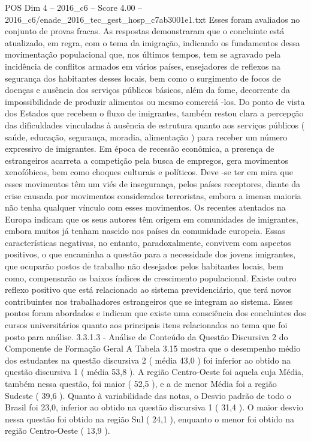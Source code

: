 \begin{textsample}{POS Dim 4 – 2016\_c6 – Score 4.00 – 2016\_c6/enade\_2016\_tec\_gest\_hosp\_c7ab3001e1.txt}
Esses foram avaliados no conjunto de provas fracas.
As respostas demonstraram que o concluinte está atualizado, em regra, com o tema da imigração, indicando os fundamentos dessa movimentação populacional que, nos últimos tempos, tem se agravado pela incidência de conflitos armados em vários países, ensejadores de reflexos na segurança dos habitantes desses locais, bem como o surgimento de focos de doenças e ausência dos serviços públicos básicos, além da fome, decorrente da impossibilidade de produzir alimentos ou mesmo comerciá -los.
Do ponto de vista dos Estados que recebem o fluxo de imigrantes, também restou clara a percepção das dificuldades vinculadas à ausência de estrutura quanto aos serviços públicos ( saúde, educação, segurança, moradia, alimentação ) para receber um número expressivo de imigrantes.
Em época de recessão econômica, a presença de estrangeiros acarreta a competição pela busca de empregos, gera movimentos xenofóbicos, bem como choques culturais e políticos.
Deve -se ter em mira que esses movimentos têm um viés de insegurança, pelos países receptores, diante da crise causada por movimentos considerados terroristas, embora a imensa maioria não tenha qualquer vínculo com esses movimentos.
Os recentes atentados na Europa indicam que os seus autores têm origem em comunidades de imigrantes, embora muitos já tenham nascido nos países da comunidade europeia.
Essas características negativas, no entanto, paradoxalmente, convivem com aspectos positivos, o que encaminha a questão para a necessidade dos jovens imigrantes, que ocuparão postos de trabalho não desejados pelos habitantes locais, bem como, compensarão os baixos índices de crescimento populacional.
Existe outro reflexo positivo que está relacionado ao sistema previdenciário, que terá novos contribuintes nos trabalhadores estrangeiros que se integram ao sistema.
Esses pontos foram abordados e indicam que existe uma consciência dos concluintes dos cursos universitários quanto aos principais itens relacionados ao tema que foi posto para análise. 3.3.1.3 - Análise de Conteúdo da Questão Discursiva 2 do Componente de Formação Geral A Tabela 3.15 mostra que o desempenho médio dos estudantes na questão discursiva 2 ( média 43,0 ) foi inferior ao obtido na questão discursiva 1 ( média 53,8 ).
A região Centro-Oeste foi aquela cuja Média, também nessa questão, foi maior ( 52,5 ), e a de menor Média foi a região Sudeste ( 39,6 ).
Quanto à variabilidade das notas, o Desvio padrão de todo o Brasil foi 23,0, inferior ao obtido na questão discursiva 1 ( 31,4 ).
O maior desvio nessa questão foi obtido na região Sul ( 24,1 ), enquanto o menor foi obtido na região Centro-Oeste ( 13,9 ).

\end{textsample}
